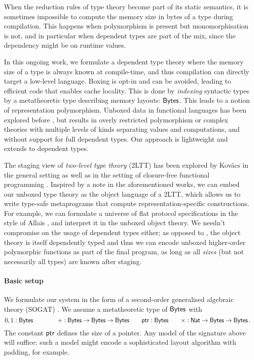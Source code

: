 When the reduction rules of type theory become part of its static semantics, it
is sometimes impossible to compute the memory size in bytes of a type during compilation.
This happens when polymorphism is present but monomorphisation is not, and in
particular when dependent types are part of the mix, since the dependency might
be on runtime values.

In this ongoing work, we formulate a dependent type theory where the memory size
of a type is always known at compile-time, and thus compilation can directly
target a low-level language. Boxing is opt-in and
can be avoided, leading to efficient code that enables cache locality. This is
done by \emph{indexing} syntactic types by a metatheoretic type describing
memory layouts: $\textsf{Bytes}$. This leads to a notion of representation polymorphism.
Unboxed data in functional languages has been explored before
\cite{Jones1991-ik,Downen2024-nk}, but results in overly restricted polymorphism
or complex theories with multiple levels of kinds separating values and
computations, and without support for full dependent types. Our approach is
lightweight and extends to dependent types.

The staging view of \emph{two-level type theory} (2LTT) \cite{Annenkov2023-vk}
has been explored by Kov\'acs in the general setting \cite{Kovacs2022-rf} as
well as in the setting of closure-free functional programming
\cite{Kovacs2024-hn}. Inspired by a note in the aforementioned works, we can embed
our unboxed type theory as the object language of a 2LTT, which allows us to
write type-safe metaprograms that compute representation-specific constructions.
For example, we can formulate a universe of flat protocol specifications in the
style of Allais \cite{Allais2023-zq}, and interpret it in the unboxed object
theory.
We needn't compromise on the usage of dependent types either; as opposed to
\cite{Kovacs2024-hn}, the object theory is itself dependently typed and thus we
can encode unboxed higher-order polymorphic functions as part of the final
program, as long as all \emph{sizes} (but not necessarily all types) are known after staging.

\paragraph{Basic setup}
We formulate our system in the form of a second-order generalised
algebraic theory (SOGAT) \cite{Kaposi2024-db}.
We assume a metatheoretic type of
\(\textsf{Bytes}\) with
\[
	0, 1 : \textsf{Bytes} \qquad \qquad + : \textsf{Bytes} \to \textsf{Bytes} \to \textsf{Bytes} \qquad \textsf{ptr} : \textsf{Bytes} \qquad \times : \textsf{Nat} \to \textsf{Bytes} \to \textsf{Bytes} \,.
\]
The constant \(\textsf{ptr}\) defines the size of a pointer. Any model of
the signature above will suffice; such a model might encode a sophisticated
layout algorithm with padding, for example.

